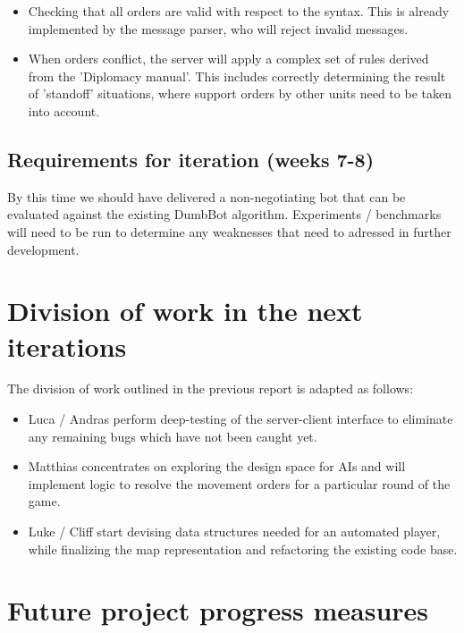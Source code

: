 \documentclass[12pt]{article}
\begin{document}
\begin{itemize}
\begin{itemize}
\item Checking that all orders are valid with respect to the syntax. This is
already implemented by the message parser, who will reject invalid messages.

\item When orders conflict, the server will apply a complex set of rules
derived from the 'Diplomacy manual'. This includes correctly determining
the result of 'standoff' situations, where support orders by other units
need to be taken into account.
\end{itemize}

\subsection{Requirements for iteration (weeks 7-8)}

By this time we should have delivered a non-negotiating bot that 
can be evaluated against the existing DumbBot algorithm. Experiments / 
benchmarks will need to be run to determine any weaknesses that need
to adressed in further development.

\section{Division of work in the next iterations}

The division of work outlined in the previous report is adapted as follows: 

\begin{itemize}

\item Luca / Andras perform deep-testing of the server-client interface
to eliminate any remaining bugs which have not been caught yet.

\item Matthias concentrates on exploring the design space for AIs and
will implement logic to resolve the movement orders for a particular 
round of the game.

\item Luke / Cliff start devising data structures needed for an 
automated player, while finalizing the map representation and
refactoring the existing code base.

\end{itemize}

\section{Future project progress measures}


\end{itemize}
\end{document}
